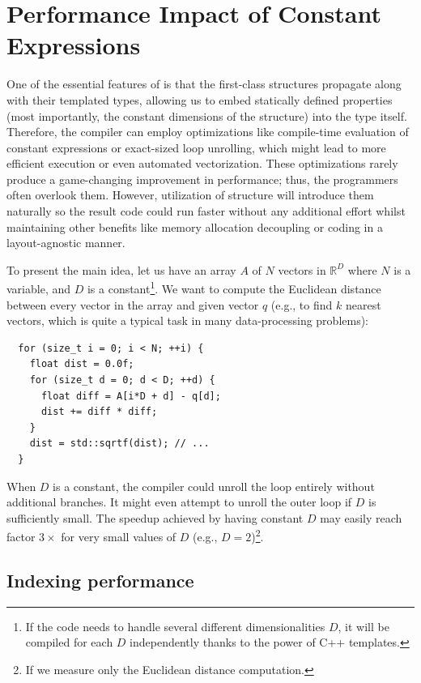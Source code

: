\section{Performance Impact of Constant Expressions}\label{sec:perf}

One of the essential features of \Noarr{} is that the first-class structures propagate along with their templated types, allowing us to embed statically defined properties (most importantly, the constant dimensions of the structure) into the type itself. Therefore, the compiler can employ optimizations like compile-time evaluation of constant expressions or exact-sized loop unrolling, which might lead to more efficient execution or even automated vectorization. These optimizations rarely produce a game-changing improvement in performance; thus, the programmers often overlook them. However, utilization of \Noarr{} structure will introduce them naturally so the result code could run faster without any additional effort whilst maintaining other benefits like memory allocation decoupling or coding in a layout-agnostic manner.

To present the main idea, let us have an array $A$ of $N$ vectors in $\mathbb{R}^D$ where $N$ is a variable, and $D$ is a constant\footnote{If the code needs to handle several different dimensionalities $D$, it will be compiled for each $D$ independently thanks to the power of C++ templates.}. We want to compute the Euclidean distance between every vector in the array and given vector $q$ (e.g., to find $k$ nearest vectors, which is quite a typical task in many data-processing problems):

\begin{verbatim}
  for (size_t i = 0; i < N; ++i) {
    float dist = 0.0f;
    for (size_t d = 0; d < D; ++d) {
      float diff = A[i*D + d] - q[d];
      dist += diff * diff;
    }
    dist = std::sqrtf(dist); // ...
  }
\end{verbatim}

When $D$ is a constant, the compiler could unroll the loop entirely without additional branches. It might even attempt to unroll the outer loop if $D$ is sufficiently small. The speedup achieved by having constant $D$ may easily reach factor $3\times$ for very small values of $D$ (e.g., $D=2$)\footnote{If we measure only the Euclidean distance computation.}.


\subsection{Indexing performance}

